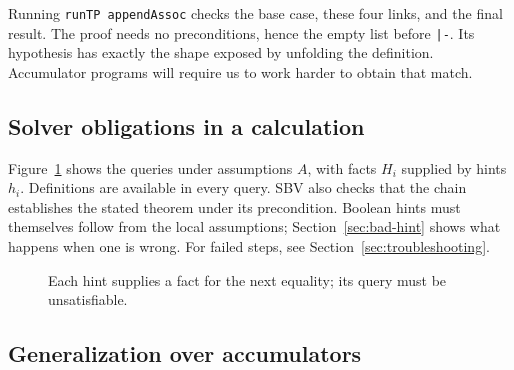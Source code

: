 \documentclass[review]{jfp-epi}
\newcommand{\code}[1]{\texttt{#1}}
\begin{document}
Running \code{runTP appendAssoc} checks the base case, these four links, and
the final result. The proof needs no preconditions, hence the empty list before
\code{|-}. Its hypothesis has exactly the shape exposed by unfolding the
definition. Accumulator programs will require us to work harder to obtain
that match.

\subsection{Solver obligations in a calculation}

Figure~\ref{fig:calculation} shows the queries under assumptions $A$, with
facts $H_i$ supplied by hints $h_i$. Definitions are available in every query.
SBV also checks that the chain establishes the stated theorem under its
precondition. Boolean hints must themselves follow from the local assumptions;
Section~\ref{sec:bad-hint} shows what happens when one is wrong. For failed
steps, see Section~\ref{sec:troubleshooting}.

\begin{figure}[htbp]
\centering
{}
\caption{Each hint supplies a fact for the next equality; its query must be unsatisfiable.}
\label{fig:calculation}
\end{figure}

\subsection{Generalization over accumulators}
\end{document}
